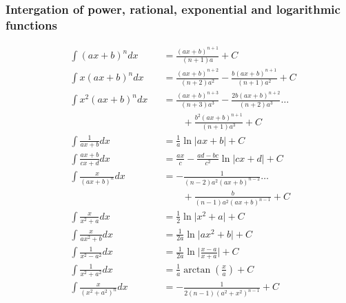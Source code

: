 \subsubsection{Intergation of power, rational, exponential and logarithmic functions}
\begin{footnotesize}
    \begin{align*}
         & \int {(ax+b)}^n dx                    &  & =\frac{{(ax+b)}^{n+1}}{(n+1)a}+C                                                  \\
         & \int x{(ax+b)}^n dx                   &  & =\frac{{(ax+b)}^{n+2}}{(n+2)a^2}-\frac{b{(ax+b)}^{n+1}}{(n+1)a^2}+C               \\
         & \int x^2{(ax+b)}^n dx                 &  & =\frac{{(ax+b)}^{n+3}}{(n+3)a^3}-\frac{2b{(ax+b)}^{n+2}}{(n+2)a^3} \dots          \\
         &                                       &  & \qquad +\frac{b^2{(ax+b)}^{n+1}}{(n+1)a^3}+C                                      \\
         & \int \frac{1}{ax+b}dx                 &  & =\frac{1}{a}\ln\vert ax+b \vert +C                                                \\
         & \int \frac{ax+b}{cx+d}dx              &  & =\frac{ax}{c}-\frac{ad-bc}{c^2}\ln\vert cx+d \vert +C                             \\
         & \int \frac{x}{{(ax+b)}^n}dx           &  & =-\frac{1}{(n-2)a^2{(ax+b)}^{n-2}} \dots                                          \\
         &                                       &  & \qquad +\frac{b}{(n-1)a^2{(ax+b)}^{n-1}}+C                                        \\
         & \int \frac{x}{x^2+a}dx                &  & =\frac{1}{2}\ln\vert x^2+a \vert+C                                                \\
         & \int \frac{x}{ax^2+b}dx               &  & =\frac{1}{2a}\ln \vert ax^2+b \vert+C                                             \\
         & \int \frac{1}{x^2-a^2}dx              &  & =\frac{1}{2a}\ln \vert \frac{x-a}{x+a}\vert+C                                     \\
         & \int \frac{1}{x^2+a^2}dx              &  & =\frac{1}{a}\arctan(\frac{x}{a})+C                                                \\
         & \int \frac{x}{{(x^2+a^2)}^n}dx        &  & =-\frac{1}{2(n-1){(a^2+x^2)}^{n-1}}+C                                             \\

\end{align*}
\end{footnotesize}
